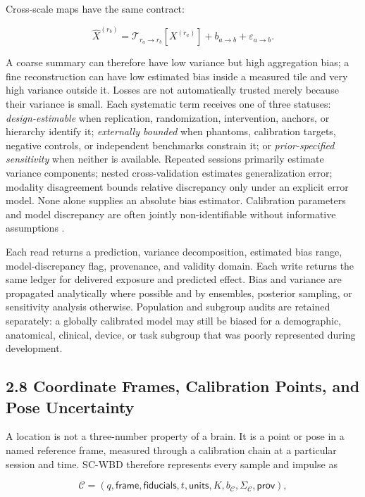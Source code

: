 Cross-scale maps have the same contract:

\[
\widehat X^{(r_b)}=
\mathcal{T}_{r_a\rightarrow r_b}
\!\left[X^{(r_a)}\right]
+b_{a\rightarrow b}
+\varepsilon_{a\rightarrow b}.
\]

A coarse summary can therefore have low variance but high aggregation bias; a
fine reconstruction can have low estimated bias inside a measured tile and
very high variance outside it. Losses are not automatically trusted merely
because their variance is small. Each systematic term receives one of three
statuses: \emph{design-estimable} when replication, randomization,
intervention, anchors, or hierarchy identify it; \emph{externally bounded}
when phantoms, calibration targets, negative controls, or independent
benchmarks constrain it; or \emph{prior-specified sensitivity} when neither is
available. Repeated sessions primarily estimate variance components; nested
cross-validation estimates generalization error; modality disagreement bounds
relative discrepancy only under an explicit error model. None alone supplies
an absolute bias estimator. Calibration parameters and model discrepancy are
often jointly non-identifiable without informative assumptions
\citep{kennedy2001,brynjarsdottir2014}.

Each read returns a prediction, variance decomposition, estimated bias range,
model-discrepancy flag, provenance, and validity domain. Each write returns
the same ledger for delivered exposure and predicted effect. Bias and variance
are propagated analytically where possible and by ensembles, posterior
sampling, or sensitivity analysis otherwise. Population and subgroup audits
are retained separately: a globally calibrated model may still be biased for
a demographic, anatomical, clinical, device, or task subgroup that was poorly
represented during development.

\subsection{2.8 Coordinate Frames, Calibration Points, and Pose Uncertainty}

A location is not a three-number property of a brain. It is a point or pose in
a named reference frame, measured through a calibration chain at a particular
session and time. SC-WBD therefore represents every sample and impulse as

\[
\mathcal{C}=
\left(q,\mathsf{frame},\mathsf{fiducials},t,
\mathsf{units},K,b_{\mathcal C},\Sigma_{\mathcal C},
\mathsf{prov}\right),
\]


